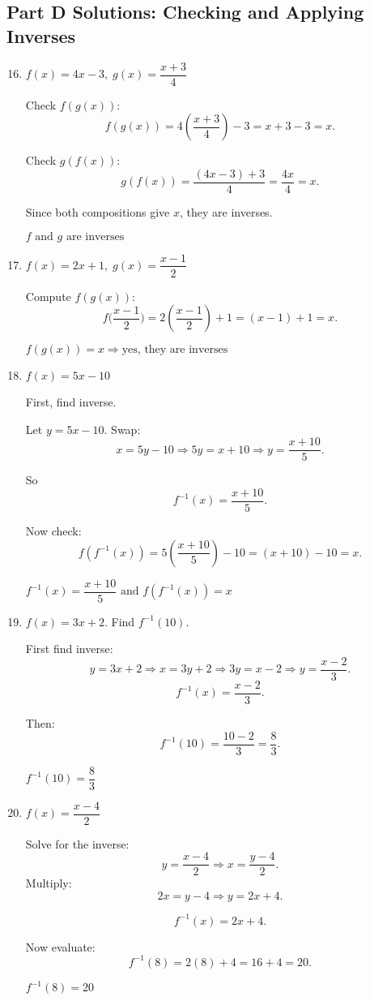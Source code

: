 \documentclass[12pt]{article}
\begin{document}
\subsection*{Part D Solutions: Checking and Applying Inverses}
\begin{enumerate}
  \setcounter{enumi}{15}
  \item \(f(x) = 4x - 3,\; g(x) = \dfrac{x + 3}{4}\)

  Check \(f(g(x))\):
  \[
  f(g(x)) = 4\left(\frac{x + 3}{4}\right) - 3 = x + 3 - 3 = x.
  \]

  Check \(g(f(x))\):
  \[
  g(f(x)) = \frac{(4x - 3) + 3}{4} = \frac{4x}{4} = x.
  \]

  Since both compositions give \(x\), they are inverses.

  \(\boxed{f \text{ and } g \text{ are inverses}}\)

  \item \(f(x) = 2x + 1,\; g(x) = \dfrac{x - 1}{2}\)

  Compute \(f(g(x))\):
  \[
  f\bigg(\frac{x - 1}{2}\bigg) = 2\left(\frac{x - 1}{2}\right) + 1 = (x - 1) + 1 = x.
  \]

  \(\boxed{f(g(x)) = x \Rightarrow \text{yes, they are inverses}}\)

  \item \(f(x) = 5x - 10\)

  First, find inverse.

  Let \(y = 5x - 10.\) Swap:
  \[
  x = 5y - 10 \Rightarrow 5y = x + 10 \Rightarrow y = \frac{x + 10}{5}.
  \]

  So
  \[
  f^{-1}(x) = \frac{x + 10}{5}.
  \]

  Now check:
  \[
  f(f^{-1}(x)) = 5\left(\frac{x + 10}{5}\right) - 10 = (x + 10) - 10 = x.
  \]

  \(\boxed{f^{-1}(x) = \dfrac{x + 10}{5} \text{ and } f(f^{-1}(x)) = x}\)

  \item \(f(x) = 3x + 2.\) Find \(f^{-1}(10)\).

  First find inverse:
  \[
  y = 3x + 2 \Rightarrow x = 3y + 2 \Rightarrow 3y = x - 2 \Rightarrow y = \frac{x - 2}{3}.
  \]
  \[
  f^{-1}(x) = \frac{x - 2}{3}.
  \]

  Then:
  \[
  f^{-1}(10) = \frac{10 - 2}{3} = \frac{8}{3}.
  \]

  \(\boxed{f^{-1}(10) = \dfrac{8}{3}}\)

  \item \(f(x) = \dfrac{x - 4}{2}\)

  Solve for the inverse:
  \[
  y = \frac{x - 4}{2} \Rightarrow x = \frac{y - 4}{2}.
  \]
  Multiply:
  \[
  2x = y - 4 \Rightarrow y = 2x + 4.
  \]

  \[
  f^{-1}(x) = 2x + 4.
  \]

  Now evaluate:
  \[
  f^{-1}(8) = 2(8) + 4 = 16 + 4 = 20.
  \]

  \(\boxed{f^{-1}(8) = 20}\)
\end{enumerate}
\end{document}
